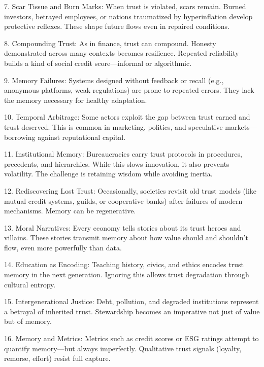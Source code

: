 \documentclass[11pt,oneside]{book}
\begin{document}
7. Scar Tissue and Burn Marks: When trust is violated, scars remain. Burned investors, betrayed employees, or nations traumatized by hyperinflation develop protective reflexes. These shape future flows even in repaired conditions.



8. Compounding Trust: As in finance, trust can compound. Honesty demonstrated across many contexts becomes resilience. Repeated reliability builds a kind of social credit score—informal or algorithmic.



9. Memory Failures: Systems designed without feedback or recall (e.g., anonymous platforms, weak regulations) are prone to repeated errors. They lack the memory necessary for healthy adaptation.



10. Temporal Arbitrage: Some actors exploit the gap between trust earned and trust deserved. This is common in marketing, politics, and speculative markets—borrowing against reputational capital.



11. Institutional Memory: Bureaucracies carry trust protocols in procedures, precedents, and hierarchies. While this slows innovation, it also prevents volatility. The challenge is retaining wisdom while avoiding inertia.



12. Rediscovering Lost Trust: Occasionally, societies revisit old trust models (like mutual credit systems, guilds, or cooperative banks) after failures of modern mechanisms. Memory can be regenerative.



13. Moral Narratives: Every economy tells stories about its trust heroes and villains. These stories transmit memory about how value should and shouldn’t flow, even more powerfully than data.



14. Education as Encoding: Teaching history, civics, and ethics encodes trust memory in the next generation. Ignoring this allows trust degradation through cultural entropy.



15. Intergenerational Justice: Debt, pollution, and degraded institutions represent a betrayal of inherited trust. Stewardship becomes an imperative not just of value but of memory.



16. Memory and Metrics: Metrics such as credit scores or ESG ratings attempt to quantify memory—but always imperfectly. Qualitative trust signals (loyalty, remorse, effort) resist full capture.
\end{document}
